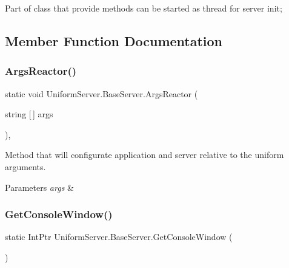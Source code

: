 Part of class that provide methods can be started as thread for server init; 

\subsection{Member Function Documentation}
\mbox{\label{class_uniform_server_1_1_base_server_a992660752da60019c348e18226a87bf2}} 
\subsubsection{\texorpdfstring{Args\+Reactor()}{ArgsReactor()}}
{\footnotesize\ttfamily static void Uniform\+Server.\+Base\+Server.\+Args\+Reactor (\begin{DoxyParamCaption}\item[{string \mbox{[}$\,$\mbox{]}}]{args }\end{DoxyParamCaption})\hspace{0.3cm}{\ttfamily [static]}, {\ttfamily [protected]}}



Method that will configurate application and server relative to the uniform arguments. 


\begin{DoxyParams}{Parameters}
{\em args} & \\
\hline
\end{DoxyParams}
\mbox{\label{class_uniform_server_1_1_base_server_a1b7d5587de4974fad2ec366a571791e0}} 
\subsubsection{\texorpdfstring{Get\+Console\+Window()}{GetConsoleWindow()}}
{\footnotesize\ttfamily static Int\+Ptr Uniform\+Server.\+Base\+Server.\+Get\+Console\+Window (\begin{DoxyParamCaption}{ }\end{DoxyParamCaption})\hspace{0.3cm}{\ttfamily [protected]}}



